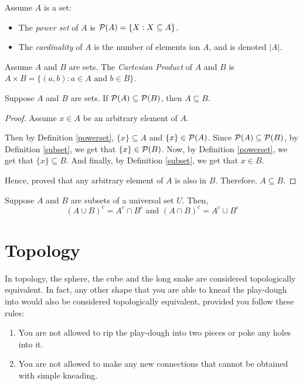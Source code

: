 \begin{definition}\label{powerset}\label{cardinality}
	Assume $A$ is a set:
	\begin{itemize}
		\item The \emph{power set} of $A$ is $\mathcal{P}(A) = \{ X : X \subseteq A \}$.
		\item The \emph{cardinality} of $A$ is the number of elements ion $A$, and is denoted $|A|$.
	\end{itemize}
\end{definition}


\begin{definition}\label{cartesian}
	Assume $A$ and $B$ are sets. The \emph{Cartesian Product} of $A$ and $B$ is $A \times B = \{(a, b) : a \in A \text{ and } b \in B \}$.
\end{definition}

\begin{proposition}
	Suppose $A$ and $B$ are sets. If $\mathcal{P}(A) \subseteq \mathcal{P}(B)$, then $A \subseteq B$.
\end{proposition}
\begin{proof}
	Assume $x \in A$ be an arbitrary element of $A$.

	Then by Definition \ref{powerset}, $\{ x \} \subseteq A$ and $\{ x \} \in \mathcal{P}(A)$. 
	Since $\mathcal{P}(A) \subseteq \mathcal{P}(B)$, by Definition \ref{subset}, we get that $\{ x \} \in \mathcal{P}(B)$. 
	Now, by Definition \ref{powerset}, we get that $\{ x \} \subseteq B$.
	And finally, by Definition \ref{subset}, we get that $x \in B$.

	Hence, proved that any arbitrary element of $A$ is also in $B$. Therefore, $A \subseteq B$.
\end{proof}


\begin{theorem}\label{demorgan}
	Suppose $A$ and $B$ are subsets of a universal set $U$. Then, 
	$$(A \cup B)^c = A^c \cap B^c \text{ and } (A \cap B)^c = A^c \cup B^c$$
\end{theorem}

\section{Topology}

In topology, the sphere, the cube and the long snake are considered topologically equivalent. In fact, any other shape that you are able to knead the play-dough into would also be considered topologically equivalent, provided you follow these rules:
\begin{enumerate}
	\item You are not allowed to rip the play-dough into two pieces or poke any holes into it.
	\item You are not allowed to make any new connections that cannot be obtained with simple kneading.
\end{enumerate}

